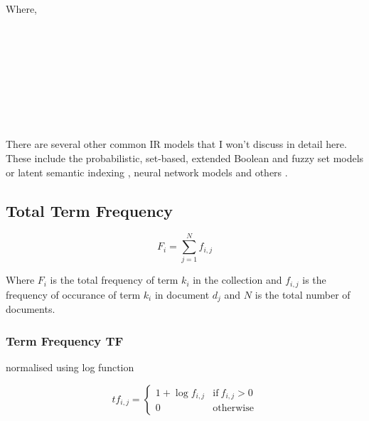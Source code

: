 Where,\\
 \\
 \\
 \\
 \\
 \\
 \\
 \\
 \\
 

There are several other common IR models that I won't discuss in detail here. These include the probabilistic, set-based, extended Boolean and fuzzy set \citep{Miyamoto2010, Miyamoto1988, Srinivasan2001, Widyantoro2001, Miyamoto1986} models or latent semantic indexing \citep{Deerwester1990}, neural network models and others \citep{Macdonald2009, Schuetze1998, Schuetze}.

\subsection*{Total Term Frequency}

\begin{equation}
  F_i = \sum_{j=1}^{N}f_{i,j}
\end{equation}

Where $F_i$ is the total frequency of term $k_i$ in the collection and $f_{i,j}$ is the frequency of occurance of term $k_i$ in document $d_j$ and $N$ is the total number of documents.

\subsubsection*{Term Frequency TF}

normalised using log function

\begin{equation}
  tf_{i,j}=
  \begin{cases}
  1+\log f_{i,j} & \text{if} \ f_{i,j} > 0\\
  0 & \text{otherwise}
  \end{cases}
\end{equation}

